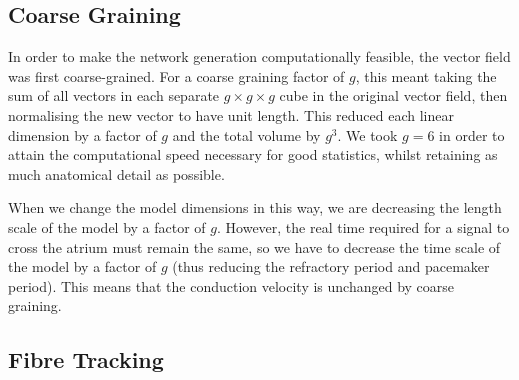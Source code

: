 \subsection{Coarse Graining}

In order to make the network generation computationally feasible, the vector field was first coarse-grained. For a coarse graining factor of $g$, this meant taking the sum of all vectors in each separate $g \times g \times g$ cube in the original vector field, then normalising the new vector to have unit length. This reduced each linear dimension by a factor of $g$ and the total volume by $g^3$. We took $g = 6$ in order to attain the computational speed necessary for good statistics, whilst retaining as much anatomical detail as possible.

When we change the model dimensions in this way, we are decreasing the length scale of the model by a factor of $g$. However, the real time required for a signal to cross the atrium must remain the same, so we have to decrease the time scale of the model by a factor of $g$ (thus reducing the refractory period and pacemaker period). This means that the conduction velocity is unchanged by coarse graining.

\subsection{Fibre Tracking}

